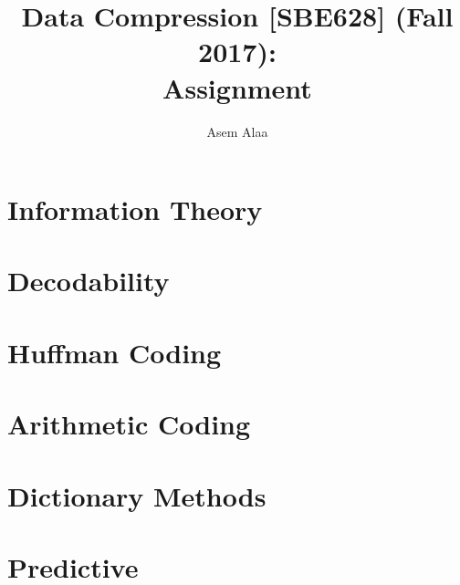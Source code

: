 \documentclass[a4paper,11pt]{book}
\begin{document}
\author{Asem Alaa}

\title{Data Compression [SBE628] (Fall 2017):\\ Assignment}

\maketitle

\chapter*{Information Theory}



\chapter*{Decodability}



\chapter*{Huffman Coding}


\chapter*{Arithmetic Coding}


\chapter*{Dictionary Methods}


\chapter*{Predictive}

\end{document}
